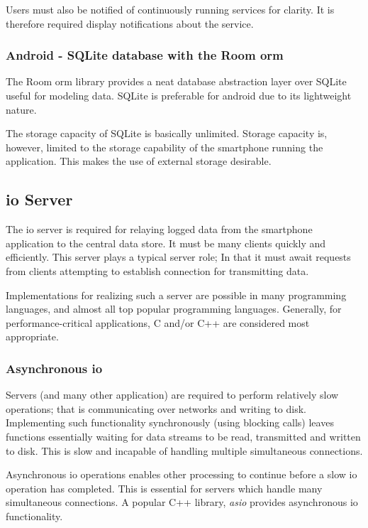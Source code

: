 Users must also be notified of continuously running services for clarity.
It is therefore required display notifications about the service.
\cite{noauthor_foreground_nodate}

\subsubsection{Android - SQLite database with the Room \ac{orm}}
The Room \ac{orm} library provides a neat database abstraction layer over SQLite useful for modeling data.
SQLite is preferable for android due to its lightweight nature.
\cite{noauthor_save_nodate}

The storage capacity of SQLite is basically unlimited.
Storage capacity is, however, limited to the storage capability of the smartphone running the application.
This makes the use of external storage desirable.

\subsection{\ac{io} Server}
The \ac{io} server is required for relaying logged data from the smartphone application to the central data store. It must be many clients quickly and efficiently.
This server plays a typical server role; In that it must await requests from clients attempting to establish connection for transmitting data.

Implementations for realizing such a server are possible in many programming languages, and almost all top popular programming languages. 
Generally, for performance-critical applications, C and/or C++ are considered most appropriate. \cite{ogala2020comparative}

\subsubsection{Asynchronous \Ac{io}}
Servers (and many other application) are required to perform relatively slow operations; that is communicating over networks and writing to disk.
Implementing such functionality synchronously (using blocking calls) leaves functions essentially waiting for data streams to be read, transmitted and written to disk.
This is slow and incapable of handling multiple simultaneous connections.

Asynchronous \ac{io} operations enables other processing to continue before a slow \ac{io} operation has completed.
This is essential for servers which handle many simultaneous connections.
A popular C++ library, \textit{asio} provides asynchronous \ac{io} functionality.
\cite{anggoro2015boost}

